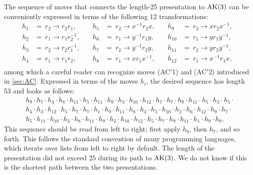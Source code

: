 The sequence of moves that connects the length-25 presentation to $\text{AK}(3)$ can be conveniently expressed in terms of the following 12 transformations:
\[
\begin{aligned}
h_1 &= \ r_2 \rightarrow r_2 r_1, & \quad h_5 &= \ r_2 \rightarrow x^{-1} r_2 x, & \quad h_9 &= \ r_2 \rightarrow x r_2 x^{-1}, \\
h_2 &= \ r_1 \rightarrow r_1 r_2^{-1}, & \quad h_6 &= \ r_1 \rightarrow y^{-1} r_1 y, & \quad h_{10} &= \ r_1 \rightarrow y r_1 y^{-1}, \\
h_3 &= \ r_2 \rightarrow r_2 r_1^{-1}, & \quad h_7 &= \ r_2 \rightarrow y^{-1} r_2 y, & \quad h_{11} &= \ r_2 \rightarrow y r_2 y^{-1}, \\
h_4 &= \ r_1 \rightarrow r_1 r_2, & \quad h_8 &= \ r_1 \rightarrow x r_1 x^{-1}, & \quad h_{12} &= \ r_1 \rightarrow x^{-1} r_1 x, \\
\end{aligned}
\]
among which a careful reader can recognize moves (AC$'$1) and (AC$'$2) introduced in \autoref{sec:AC}. Expressed in terms of the moves $h_i$, the desired sequence has length 53 and looks as follows:
\[
\begin{aligned}
& h_9 \cdot h_7 \cdot h_4 \cdot h_8 \cdot h_{11} \cdot h_5 \cdot h_{11} \cdot h_9 \cdot h_3 \cdot h_{10} \cdot h_{12} \cdot h_7 \cdot h_7 \cdot h_9 \cdot h_{11} \cdot h_5 \cdot h_3 \cdot h_5 \cdot \\
& h_4 \cdot h_3 \cdot h_{12} \cdot h_5 \cdot h_7 \cdot h_7 \cdot h_1 \cdot h_9 \cdot h_{11} \cdot h_8 \cdot h_3 \cdot h_5 \cdot h_{10} \cdot h_2 \cdot h_6 \cdot h_{12} \cdot h_9 \cdot h_7 \cdot \\
& h_5 \cdot h_{11} \cdot h_{10} \cdot h_3 \cdot h_8 \cdot h_{11} \cdot h_9 \cdot h_2 \cdot h_{10} \cdot h_{12} \cdot h_5 \cdot h_7 \cdot h_9 \cdot h_{11} \cdot h_1 \cdot h_9 \cdot h_8.
\end{aligned}
\]
This sequence should be read from left to right; first apply $h_9$, then $h_7$, and so forth. This follows the standard convention of many programming languages, which iterate over lists from left to right by default. The length of the presentation did not exceed $25$ during its path to $\text{AK}(3)$. We do not know if this is the shortest path between the two presentations.


